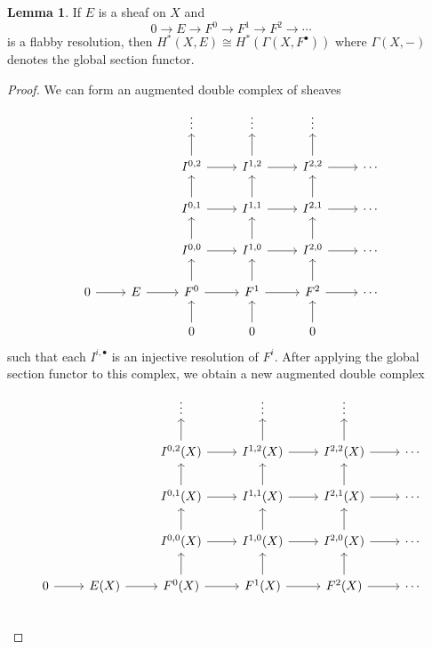 \documentclass[10pt,letterpaper,cm]{nupset}
\theoremstyle{definition}
\theoremstyle{theorem}
\newtheorem{lemma}[definition]{Lemma}
\theoremstyle{remark}
\newcommand{\1}{\mathbb{1}}
\newcommand{\0}{\vec 0}
\begin{document}
\begin{lemma}
If $E$ is a sheaf on $X$ and $$0 \to E \to F^0 \to F^1 \to F^2 \to \cdots$$ is a flabby resolution, then $H^{\ast}(X, E) \cong H^{\ast}( \Gamma(X, F^{\bullet}))$ where $\Gamma(X, {-})$ denotes the global section functor. 
\end{lemma}
\begin{proof}
 We can form an augmented double complex of sheaves
\[
\begin{tikzcd}
            &       & \vdots                        & \vdots                        & \vdots                        &        \\
            &             & {I^{0,2}} \arrow[u] \arrow[r] & {I^{1,2}} \arrow[u] \arrow[r] & {I^{2,2}} \arrow[u] \arrow[r] & \cdots \\
            &             & {I^{0,1}} \arrow[r] \arrow[u] & {I^{1,1}} \arrow[r] \arrow[u] & {I^{2,1}} \arrow[r] \arrow[u] & \cdots \\
            &             & {I^{0,0}} \arrow[r] \arrow[u] & {I^{1,0}} \arrow[r] \arrow[u] & {I^{2,0}} \arrow[r] \arrow[u] & \cdots \\
0 \arrow[r] & E \arrow[r] & F^0 \arrow[r] \arrow[u]       & F^1 \arrow[r] \arrow[u]       & F^2 \arrow[r] \arrow[u]       & \cdots \\
            &             & 0 \arrow[u]                   & 0 \arrow[u]                   & 0 \arrow[u]                   &       
\end{tikzcd}
\]
such that each $I^{i, \bullet}$ is an injective resolution of $F^i$.
After applying the global section functor to this complex, we obtain a new augmented double complex
\[
\begin{tikzcd}
            &                & \vdots                           & \vdots                           & \vdots                           &        \\
            &                & {I^{0,2}(X)} \arrow[u] \arrow[r] & {I^{1,2}(X)} \arrow[u] \arrow[r] & {I^{2,2}(X)} \arrow[u] \arrow[r] & \cdots \\
            &                & {I^{0,1}(X)} \arrow[r] \arrow[u] & {I^{1,1}(X)} \arrow[r] \arrow[u] & {I^{2,1}(X)} \arrow[r] \arrow[u] & \cdots \\
            &                & {I^{0,0}(X)} \arrow[r] \arrow[u] & {I^{1,0}(X)} \arrow[r] \arrow[u] & {I^{2,0}(X)} \arrow[r] \arrow[u] & \cdots \\
0 \arrow[r] & E(X) \arrow[r] & F^0(X) \arrow[r] \arrow[u]       & F^1(X) \arrow[r] \arrow[u]       & F^2(X) \arrow[r] \arrow[u]       & \cdots \\

\end{tikzcd}\]
\end{proof}
\end{document}
